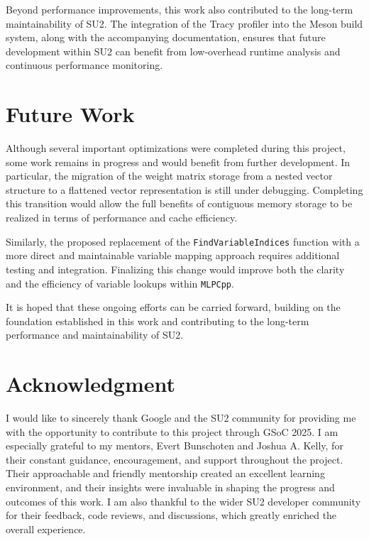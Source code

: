 \documentclass{article}
\begin{document}
Beyond performance improvements, this work also contributed to the long-term maintainability of SU2. 
The integration of the Tracy profiler into the Meson build system, along with the accompanying 
documentation, ensures that future development within SU2 can benefit from low-overhead runtime 
analysis and continuous performance monitoring. 

\section{Future Work}
\label{sec:future}

Although several important optimizations were completed during this project, some work remains in progress 
and would benefit from further development. In particular, the migration of the weight matrix storage from 
a nested vector structure to a flattened vector representation is still under debugging. Completing this 
transition would allow the full benefits of contiguous memory storage to be realized in terms of performance 
and cache efficiency. 

Similarly, the proposed replacement of the \texttt{FindVariableIndices} function with a more direct and 
maintainable variable mapping approach requires additional testing and integration. Finalizing this change 
would improve both the clarity and the efficiency of variable lookups within \texttt{MLPCpp}. 

It is hoped that these ongoing efforts can be carried forward, building on the foundation established in this 
work and contributing to the long-term performance and maintainability of SU2.

\section{Acknowledgment}
\label{sec:ack}
I would like to sincerely thank Google and the SU2 community for providing me 
with the opportunity to contribute to this project through GSoC 2025. I am 
especially grateful to my mentors, Evert Bunschoten and Joshua A. Kelly, for their constant guidance, 
encouragement, and support throughout the project. Their approachable and 
friendly mentorship created an excellent learning environment, and their insights 
were invaluable in shaping the progress and outcomes of this work. I am also 
thankful to the wider SU2 developer community for their feedback, code reviews, 
and discussions, which greatly enriched the overall experience.


\printbibliography
\end{document}

